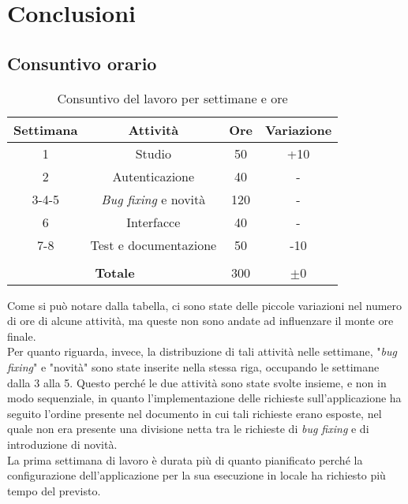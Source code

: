 \chapter{Conclusioni}
\label{cap:conclusioni}


\section{Consuntivo orario}

\renewcommand{\arraystretch}{1.3}
\begin{table}[H]
    \centering
        \begin{tabular}{| c | c | c | c |} 
        \hline
        \textbf{Settimana} & \textbf{Attività} & \textbf{Ore} & \textbf{Variazione}\\
        \hline
        1 & Studio & 50 & +10 \\ 
        \hline
        2 & Autenticazione & 40 & - \\
        \hline
        3-4-5 & \emph{Bug fixing} e novità & 120 & - \\
        \hline
        6 & Interfacce & 40 & - \\
        \hline
        7-8 & Test e documentazione & 50 & -10\\
        \hline
        \multicolumn{4}{c}{\rule{0pt}{1em}} \\
        \hline
        \multicolumn{2}{|c|}{\textbf{Totale}} & 300 & $\pm$0\\
        \hline
        \end{tabular}
        \caption{Consuntivo del lavoro per settimane e ore}
\end{table}
\renewcommand{\arraystretch}{1}

\noindent Come si può notare dalla tabella, ci sono state delle piccole variazioni nel numero di ore di alcune attività, ma queste non sono andate ad influenzare il monte ore finale.\\
Per quanto riguarda, invece, la distribuzione di tali attività nelle settimane, "\emph{bug fixing}" e "novità" sono state inserite nella stessa riga, occupando le settimane dalla 3 alla 5. Questo perché le due attività sono state svolte insieme, e non in modo sequenziale, in quanto l'implementazione delle richieste sull'applicazione ha seguito l'ordine presente nel documento in cui tali richieste erano esposte, nel quale non era presente una divisione netta tra le richieste di \emph{bug fixing} e di introduzione di novità.\\
La prima settimana di lavoro è durata più di quanto pianificato perché la configurazione dell'applicazione per la sua esecuzione in locale ha richiesto più tempo del previsto.

